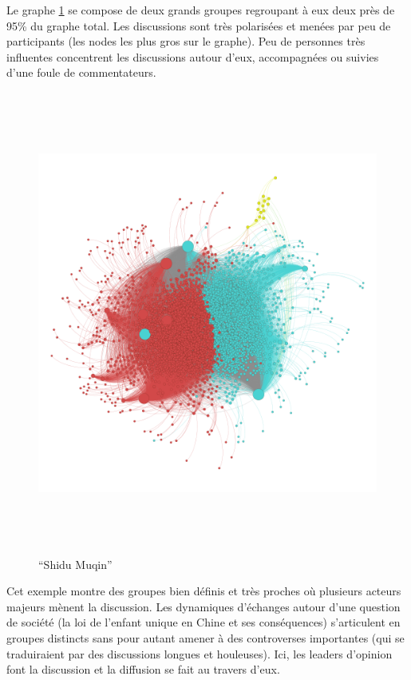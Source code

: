 \newpage

Le graphe \ref{fig:shidumuqin} se compose de deux grands groupes regroupant à eux deux près de 95\% du graphe total. Les discussions sont très polarisées et menées par peu de participants (les nodes les plus gros sur le graphe). Peu de personnes très influentes concentrent les discussions autour d{\textquoteright}eux, accompagnées ou suivies d{\textquoteright}une foule de commentateurs.  

\begin{figure}[h!]
    \centering
    \includegraphics[width=6.0114in,height=6.0114in]{figures/chap3/chapitre3-img18.png}
    \caption{{\textquotedblleft}Shidu Muqin{\textquotedblright}}
    \label{fig:shidumuqin}
\end{figure}


Cet exemple montre des groupes bien définis et très proches o\`u plusieurs acteurs majeurs mènent la discussion. Les dynamiques d{\textquoteright}échanges autour d{\textquoteright}une question de société (la loi de l{\textquoteright}enfant unique en Chine et ses conséquences) s{\textquoteright}articulent en groupes distincts sans pour autant amener à des controverses importantes (qui se traduiraient par des discussions longues et houleuses). Ici, les leaders d{\textquoteright}opinion font la discussion et la diffusion se fait au travers d{\textquoteright}eux.

